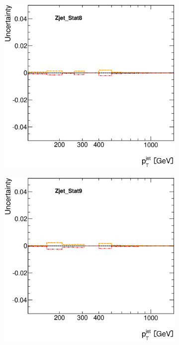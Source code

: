 \documentclass[12pt, twoside]{article}
\numberwithin{equation}{section}
\numberwithin{figure}{section}
\newenvironment{changemargin}[2]{%
\begin{list}{}{%
\setlength{\topsep}{0pt}%
\setlength{\leftmargin}{#1}%
\setlength{\rightmargin}{#2}%
\setlength{\listparindent}{\parindent}%
\setlength{\itemindent}{\parindent}%
\setlength{\parsep}{\parskip}%
}%
\item[]}{\end{list}}
\begin{document}
\begin{figure}[H]
\begin{changemargin}{-1.0cm}{-0.75cm}
\begin{changemargin}{-0.75cm}{-1.0cm}
\begin{subfigure}[b]{0.25\textwidth}
        \end{subfigure}
        \begin{subfigure}[b]{0.25\textwidth}
            \includegraphics[width=\textwidth]{./images/JetSystematics/JetSystematic-55.eps}
        \end{subfigure}
        \begin{subfigure}[b]{0.25\textwidth}
            \includegraphics[width=\textwidth]{./images/JetSystematics/JetSystematic-56.eps}
        \end{subfigure}


\end{changemargin}
\end{changemargin}
\end{figure}
\end{document}
